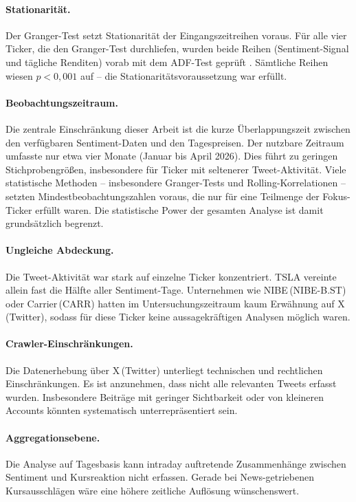 \paragraph{Stationarität.}
Der Granger-Test setzt Stationarität der Eingangszeitreihen voraus. Für alle vier Ticker, die den Granger-Test durchliefen, wurden beide Reihen (Sentiment-Signal und tägliche Renditen) vorab mit dem ADF-Test geprüft \autocite{dickey1979distribution}. Sämtliche Reihen wiesen $p < 0{,}001$ auf -- die Stationaritätsvoraussetzung war erfüllt.

\paragraph{Beobachtungszeitraum.}
Die zentrale Einschränkung dieser Arbeit ist die kurze Überlappungszeit zwischen den verfügbaren Sentiment-Daten und den Tagespreisen. Der nutzbare Zeitraum umfasste nur etwa vier Monate (Januar bis April 2026). Dies führt zu geringen Stichprobengrößen, insbesondere für Ticker mit seltenerer Tweet-Aktivität. Viele statistische Methoden -- insbesondere Granger-Tests und Rolling-Korrelationen -- setzten Mindestbeobachtungszahlen voraus, die nur für eine Teilmenge der Fokus-Ticker erfüllt waren. Die statistische Power der gesamten Analyse ist damit grundsätzlich begrenzt.

\paragraph{Ungleiche Abdeckung.}
Die Tweet-Aktivität war stark auf einzelne Ticker konzentriert. TSLA vereinte allein fast die Hälfte aller Sentiment-Tage. Unternehmen wie NIBE\,(NIBE-B.ST) oder Carrier\,(CARR) hatten im Untersuchungszeitraum kaum Erwähnung auf X\,(Twitter), sodass für diese Ticker keine aussagekräftigen Analysen möglich waren.

\paragraph{Crawler-Einschränkungen.}
Die Datenerhebung über X\,(Twitter) unterliegt technischen und rechtlichen Einschränkungen. Es ist anzunehmen, dass nicht alle relevanten Tweets erfasst wurden. Insbesondere Beiträge mit geringer Sichtbarkeit oder von kleineren Accounts könnten systematisch unterrepräsentiert sein.

\paragraph{Aggregationsebene.}
Die Analyse auf Tagesbasis kann intraday auftretende Zusammenhänge zwischen Sentiment und Kursreaktion nicht erfassen. Gerade bei News-getriebenen Kursausschlägen wäre eine höhere zeitliche Auflösung wünschenswert.

